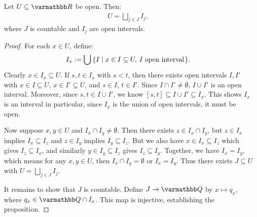    \begin{proposition}\label{prop:partition-open}
        Let $U \subseteq \bfR$ be open. Then:
            \begin{equation*}
            \begin{split}
                U = \bigsqcup_{j \in J}I_j,
            \end{split}
            \end{equation*}
        where $J$ is countable and $I_j$ are open intervals.
    \end{proposition}
        \begin{proof}
            For each $x \in U$, define:
                \begin{equation*}
                \begin{split}
                    I_x := \bigcup \h2 \{I \mid x \in I \subseteq U, \h2I \h3\text{open interval}\h1\}.
                \end{split}
                \end{equation*}
            Clearly $x \in I_x \subseteq U$. If $s,t \in I_x$ with $s < t$, then there exists open intervals $I,I'$ with $x\in I \subseteq U$, $x \in I' \subseteq U$, and $s \in I$, $t \in I'$. Since $I \cap I' \neq \emptyset$, $I \cup I'$ is an open interval. Moreover, since $s,t \in I \cup I'$, we know $[s,t] \subseteq I \cup I' \subseteq I_x$. This shows $I_x$ is an interval \textemdash in particular, since $I_x$ is the union of open intervals, it must be open.

            Now suppose $x,y \in U$ and $I_x \cap I_y \neq \emptyset$. Then there exists $z \in I_x \cap I_y$, but $z \in I_x$ implies $I_x \subseteq I_z$ and $z \in I_y$ implies $I_y \subseteq I_z$. But  we also have $x \in I_x \subseteq I_z$ which gives $I_z \subseteq I_x$, and similarly $y \in I_y \subseteq I_z$ gives $I_z \subseteq I_y$. Together, we have $I_x = I_y$, which means for any $x,y \in U$, then $I_x \cap I_y = \emptyset$ or $I_x = I_y$. Thus there exists $J \subseteq U$ with $U = \bigsqcup_{j \in J}I_j$.

            It remains to show that $J$ is countable. Define $J \rightarrow \bfQ$ by $x \mapsto q_x$, where $q_x \in \bfQ \cap I_x$. This map is injective, establishing the proposition.
        \end{proof}
    

